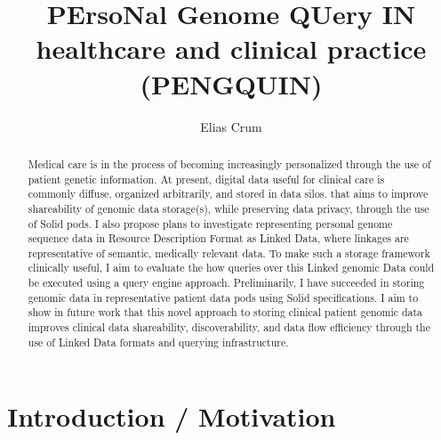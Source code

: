 \documentclass[runningheads]{llncs}
\begin{document}
\title{PErsoNal Genome QUery IN healthcare and clinical practice (PENGQUIN)}

\author{Elias Crum}



\maketitle

\begin{abstract}
	Medical care is in the process of becoming increasingly personalized through the use of patient genetic information. 
	At present, digital data useful for clinical care is commonly diffuse, organized arbitrarily, and stored in data silos. 
   that aims to improve shareability of genomic data storage(s), while preserving data privacy, through the use of Solid pods. 
	I also propose plans to investigate representing personal genome sequence data in Resource Description Format as Linked Data, where linkages are representative of semantic, medically relevant data.
	To make such a storage framework clinically useful, I aim to evaluate the how queries over this Linked genomic Data could be executed using a query engine approach.
	Preliminarily, I have succeeded in storing genomic data in representative patient data pods using Solid specifications. 
	I aim to show in future work that this novel approach to storing clinical patient genomic data improves clinical data shareability, discoverability, and data flow efficiency through the use of Linked Data formats and querying infrastructure. 


\end{abstract}


\section{Introduction / Motivation}

\end{document}
